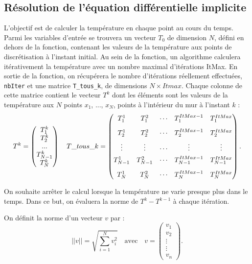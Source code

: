\documentclass[10pt,fleqn]{article} %
\begin{document}
\begin{multicols}{2}
\begin{multicols}{2}
\section{Résolution de l'équation différentielle implicite}
\ifprof
\else
L'objectif est de calculer la température en chaque point au cours du temps. Parmi les variables
d'entrée se trouvera un vecteur $T_0$ de dimension $N$, défini en dehors de la fonction,
 contenant les valeurs de la température aux points de discrétisation à l'instant initial. 
 Au sein de la fonction, un algorithme calculera itérativement la température avec un 
 nombre maximal d'itérations ItMax. En sortie de la fonction, on récupérera le nombre 
 d'itérations réellement effectuées, \texttt{nbIter} et une matrice \texttt{T\_tous\_k}, de
  dimensions $N\times Itmax$.  Chaque colonne de cette matrice contient le vecteur $T^k$
   dont les éléments sont les valeurs de la température aux $N$ points $x_1$, ..., $x_N$, 
 points à l'intérieur du mur à l'instant $k$ :
$$
T^k = \begin{pmatrix} T_1^k \\  T_2 ^k \\ ... \\  T_{N-1}^{k} \\ T_{N}^{k}  \end{pmatrix}
\quad
T\_tous\_k = 
\begin{pmatrix} 
T_1^1   & T_1^2  & \cdots & T_1^{ItMax-1} & T_{1}^{ItMax} \vspace{0.3cm} \\
T_2^1   & T_2^2  & \cdots & T_2^{ItMax-1} & T_2^{ItMax }  \vspace{0.15cm}\\
\vdots & \vdots & \cdots & \vdots & \vdots \vspace{0.15cm}\\
T_{N-1}^1   & T_{N-1}^2  & \cdots & T_{N-1}^{ItMax-1} & T_{N-1}^{ItMax} \vspace{0.3cm} \\
T_{N}^1   & T_{N}^2  & \cdots & T_{N}^{ItMax-1} & T_{N}^{ItMax}  \\
 \end{pmatrix}.
$$


On souhaite arrêter le calcul lorsque la température ne varie presque plus dans le temps. 
Dans ce but, on évaluera la norme  de $T^k - T^{k-1}$ à chaque itération. 
\begin{defi}
On définit la norme d'un vecteur $v$ par : 
$$
||v|| = \sqrt{\sum\limits_{i=1}^{N}v_i^2} \quad \text{avec} \quad v=
\begin{pmatrix} v_1 \\ v_2 \\ \vdots \\ \vdots \\ v_n \end{pmatrix}.
$$
\end{defi}


\end{multicols}
\end{multicols}
\end{document}
